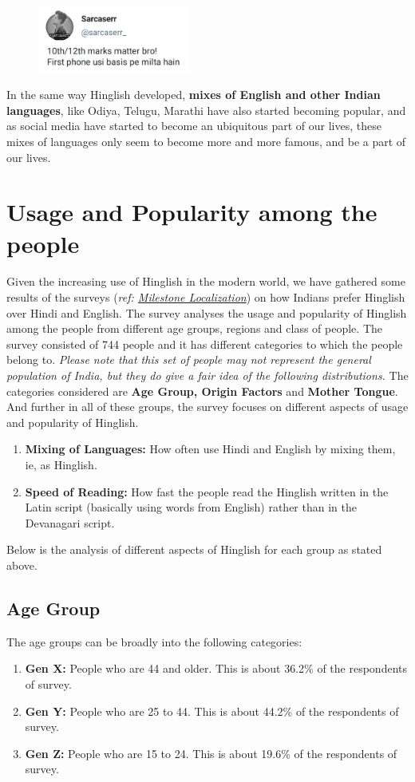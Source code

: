 \documentclass{article}
\begin{document}
\begin{figure}[H]
    \centering
    \includegraphics[width=0.45\textwidth]{images/meme.png}
\end{figure}

In the same way Hinglish developed, \textbf{mixes of English and other Indian languages}, like Odiya, Telugu, Marathi have also started becoming popular, and as social media have started to become an ubiquitous part of our lives, these mixes of languages only seem to become more and more famous, and be a part of our lives.


\section{Usage and Popularity among the people}
Given the increasing use of Hinglish in the modern world, we have gathered some results of the surveys (\textit{ref: \href{https://www.milestoneloc.com/guide-to-hinglish-language/}{Milestone Localization}}) on how Indians prefer Hinglish over Hindi and English. The survey analyses the usage and popularity of Hinglish among the people from different age groups, regions and class of people. The survey consisted of 744 people and it has different categories to which the people belong to. \textit{Please note that this set of people may not represent the general population of India, but they do give a fair idea of the following distributions.} The categories considered are \textbf{Age Group, Origin Factors} and \textbf{Mother Tongue}. And further in all of these groups, the survey focuses on different aspects of usage and popularity of Hinglish.

\begin{enumerate}
    \item \textbf{Mixing of Languages:} How often use Hindi and English by mixing them, ie, as Hinglish.
    \item \textbf{Speed of Reading:} How fast the people read the Hinglish written in the Latin script (basically using words from English) rather than in the Devanagari script.
\end{enumerate}
Below is the analysis of different aspects of Hinglish for each group as stated above.
\newpage
\subsection{Age Group}
The age groups can be broadly into the following categories:
\begin{enumerate}
    \item \textbf{Gen X:} People who are 44 and older. This is about 36.2\% of the respondents of survey.
    \item \textbf{Gen Y:} People who are 25 to 44. This is about 44.2\% of the respondents of survey.
    \item \textbf{Gen Z:} People who are 15 to 24. This is about 19.6\% of the respondents of survey.
\end{enumerate}
\end{document}
